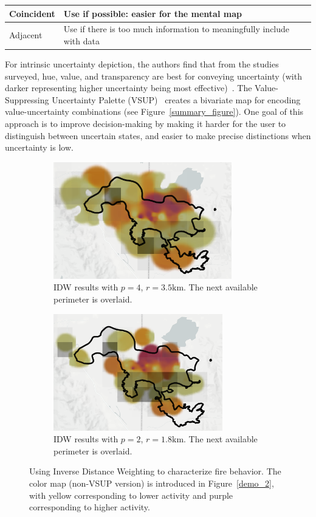 \begin{center}
    \begin{tabu} {p{2.2cm}|p{10cm}X[l]}
          Coincident & Use if possible: easier for the mental map\\
          \midrule
        Adjacent & Use if there is too much information to meaningfully include with data 
    \end{tabu}
\end{center}

For intrinsic uncertainty depiction, the authors find that from the studies surveyed, hue, value, and transparency are best for conveying uncertainty (with darker representing higher uncertainty being most effective)~\cite{Kinkeldey2014b}. The Value-Suppressing Uncertainty Palette (VSUP)~\cite{VSUP} creates a bivariate map for encoding value-uncertainty combinations (see Figure~\ref{summary_figure}). One goal of this approach is to improve decision-making by making it harder for the user to distinguish between uncertain states, and easier to make precise distinctions when uncertainty is low. 

\begin{figure}[h]
    \begin{subfigure}[t]{0.5\textwidth}
        \centering
        \includegraphics[height=2in]{images/remote_sensing/idw_casestudy_p4_r3_5.png}
        \caption{IDW results with $p=4$, $r=3.5\mathrm{km}$. The next available perimeter is overlaid.}
        \label{idw_result_1}
    \end{subfigure}
    \begin{subfigure}[t]{0.48\textwidth}
        \centering
        \includegraphics[height=2in]{images/remote_sensing/idw_casestudy_p2_r1_8.png}
        \caption{IDW results with $p=2$, $r=1.8\mathrm{km}$. The next available perimeter is overlaid.}
        \label{idw_result_2}
    \end{subfigure}
     \caption{Using Inverse Distance Weighting to characterize fire behavior. The color map (non-VSUP version) is introduced in Figure~\ref{demo_2}, with yellow corresponding to lower activity and purple corresponding to higher activity.}
     \label{idw_ref}
\end{figure}

